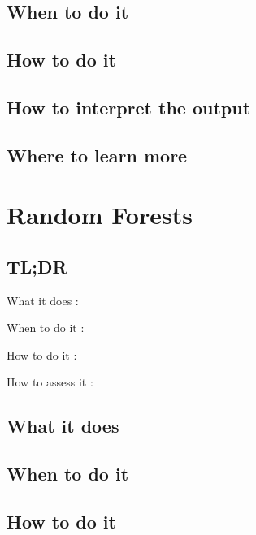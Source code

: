 \documentclass[
]{book}
\begin{document}
\hypertarget{when-to-do-it-16}{%
\section{When to do it}\label{when-to-do-it-16}}

\hypertarget{how-to-do-it-16}{%
\section{How to do it}\label{how-to-do-it-16}}

\hypertarget{how-to-interpret-the-output-16}{%
\section{How to interpret the output}\label{how-to-interpret-the-output-16}}

\hypertarget{where-to-learn-more-16}{%
\section{Where to learn more}\label{where-to-learn-more-16}}

\hypertarget{random-forests}{%
\chapter{Random Forests}\label{random-forests}}

\hypertarget{tldr-17}{%
\section{TL;DR}\label{tldr-17}}

What it does
:

When to do it
:

How to do it
:

How to assess it
:

\hypertarget{what-it-does-17}{%
\section{What it does}\label{what-it-does-17}}

\hypertarget{when-to-do-it-17}{%
\section{When to do it}\label{when-to-do-it-17}}

\hypertarget{how-to-do-it-17}{%
\section{How to do it}\label{how-to-do-it-17}}
\end{document}
